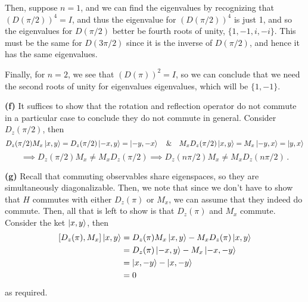 \documentclass[10pt]{article}
\begin{document}
Then, suppose $n=1$, and we can find the eigenvalues by recognizing that $(D(\pi/2))^{4} = I$, and thus the eigenvalue for $(D(\pi/2))^{4}$ is just 1, and so the eigenvalues for $D(\pi/2)$ better be fourth roots of unity, $\{1, -1, i, -i\}$. This must be the same for $D(3\pi/2)$ since it is the inverse of $D(\pi/2)$, and hence it has the same eigenvalues.

Finally, for $n=2$, we see that $(D(\pi))^{2} = I$, so we can conclude that we need the second roots of unity for eigenvalues eigenvalues, which will be $\{1,-1\}$. 

\textbf{(f)} It suffices to show that the rotation and reflection operator do not commute in a particular case to conclude they do not commute in general. Consider $D_{z}(\pi/2)$, then
\[ D_{z}(\pi/2)M_{x}\ket{x,y} = D_{z}(\pi/2)\ket{-x,y} = \ket{-y,-x} \quad \& \quad M_{x}D_{z}(\pi/2)\ket{x,y} = M_{x}\ket{-y,x} = \ket{y,x}\]
\[ \implies D_{z}(\pi/2)M_{x} \neq M_{x}D_{z}(\pi/2) \implies D_{z}(n\pi/2)M_{x} \neq M_{x}D_{z}(n\pi/2)\, .\]

\textbf{(g)} Recall that commuting observables share eigenspaces, so they are simultaneously diagonalizable. Then, we note that since we don't have to show that $H$ commutes with either $D_{z}(\pi)$ or $M_{x}$, we can assume that they indeed do commute. Then, all that is left to show is that $D_{z}(\pi)$ and $M_{x}$ commute. Consider the ket $\ket{x,y}$, then
\begin{equation*}
  \begin{split}
    [D_{z}(\pi), M_{x}]\ket{x,y} & = D_{z}(\pi)M_{x}\ket{x,y} - M_{x}D_{z}(\pi)\ket{x,y}\\
    & = D_{z}(\pi)\ket{-x,y} - M_{x}\ket{-x,-y}\\
    & = \ket{x,-y} - \ket{x,-y}\\
    & = 0\\
  \end{split}
\end{equation*}
as required. 
\end{document}

